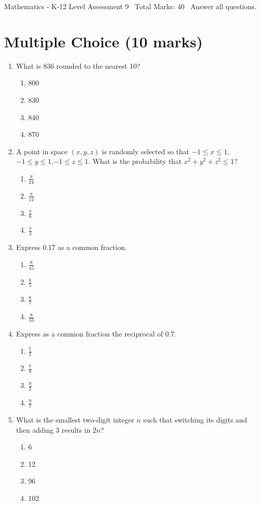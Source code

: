 \documentclass[12pt]{article}
\begin{document}
\begin{center}
Mathematics - K-12 Level Assessment 9 \
Total Marks: 40 \
Answer all questions.
\end{center}

\section*{Multiple Choice (10 marks)}
\begin{enumerate}[label=\arabic*.]
\item What is 836 rounded to the nearest 10?
\begin{enumerate}[label=(\alph*)]
    \item 800
    \item 830
    \item 840
    \item 870
\end{enumerate}
\item A point in space $(x,y,z)$ is randomly selected so that $-1\le x \le 1$,$-1\le y \le 1$,$-1\le z \le 1$. What is the probability that $x^2+y^2+z^2\le 1$?
\begin{enumerate}[label=(\alph*)]
    \item \ensuremath{\frac{\pi}{24}}
    \item \ensuremath{\frac{\pi}{12}}
    \item \ensuremath{\frac{\pi}{6}}
    \item \ensuremath{\frac{\pi}{3}}
\end{enumerate}
\item Express $0.1\overline{7}$ as a common fraction.
\begin{enumerate}[label=(\alph*)]
    \item \ensuremath{\frac{8}{45}}
    \item \ensuremath{\frac{8}{5}}
    \item \ensuremath{\frac{8}{7}}
    \item \ensuremath{\frac{8}{33}}
\end{enumerate}
\item Express as a common fraction the reciprocal of $0.\overline 7$.
\begin{enumerate}[label=(\alph*)]
    \item \ensuremath{\frac{7}{2}}
    \item \ensuremath{\frac{7}{9}}
    \item \ensuremath{\frac{9}{2}}
    \item \ensuremath{\frac{9}{7}}
\end{enumerate}
\item What is the smallest two-digit integer $n$ such that switching its digits and then adding 3 results in $2 n$?
\begin{enumerate}[label=(\alph*)]
    \item 6
    \item 12
    \item 96
    \item 102
\end{enumerate}
\end{enumerate}
\end{document}
